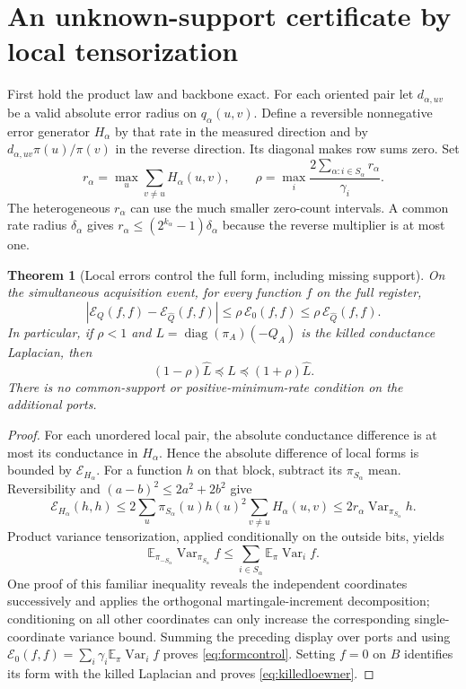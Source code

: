 \documentclass[10pt,a4paper]{article}
\newtheorem{theorem}{Theorem}[section]
\theoremstyle{definition}\newtheorem{assumption}[theorem]{Assumption}
\newcommand{\E}{\mathbb E}
\newcommand{\Var}{\operatorname{Var}}
\newcommand{\diag}{\operatorname{diag}}
\newcommand{\cE}{\mathcal E}
\begin{document}
\section{An unknown-support certificate by local tensorization}
\label{sec:tensor}

First hold the product law and backbone exact. For each oriented pair let $d_{\alpha,uv}$ be a valid absolute error radius on $q_\alpha(u,v)$. Define a reversible nonnegative error generator $H_\alpha$ by that rate in the measured direction and by $d_{\alpha,uv}\pi(u)/\pi(v)$ in the reverse direction. Its diagonal makes row sums zero. Set
\begin{equation}
 r_\alpha=\max_u\sum_{v\ne u}H_\alpha(u,v),\qquad
 \rho=\max_i\frac{2\sum_{\alpha:i\in S_\alpha}r_\alpha}{\gamma_i}.
 \label{eq:rho}
\end{equation}
The heterogeneous $r_\alpha$ can use the much smaller zero-count intervals. A common rate radius $\delta_\alpha$ gives $r_\alpha\le(2^{k_\alpha}-1)\delta_\alpha$ because the reverse multiplier is at most one.

\begin{theorem}[Local errors control the full form, including missing support]
\label{thm:tensor}
On the simultaneous acquisition event, for every function $f$ on the full register,
\begin{equation}
 |\cE_Q(f,f)-\cE_{\widehat Q}(f,f)|
 \le \rho\,\cE_0(f,f)\le\rho\,\cE_{\widehat Q}(f,f).
 \label{eq:formcontrol}
\end{equation}
In particular, if $\rho<1$ and $L=\diag(\pi_A)(-Q_A)$ is the killed conductance Laplacian, then
\begin{equation}
 (1-\rho)\widehat L\preceq L\preceq(1+\rho)\widehat L.
 \label{eq:killedloewner}
\end{equation}
There is no common-support or positive-minimum-rate condition on the additional ports.
\end{theorem}

\begin{proof}
For each unordered local pair, the absolute conductance difference is at most its conductance in $H_\alpha$. Hence the absolute difference of local forms is bounded by $\cE_{H_\alpha}$. For a function $h$ on that block, subtract its $\pi_{S_\alpha}$ mean. Reversibility and $(a-b)^2\le2a^2+2b^2$ give
\[
 \cE_{H_\alpha}(h,h)
 \le2\sum_u\pi_{S_\alpha}(u)h(u)^2
                  \sum_{v\ne u}H_\alpha(u,v)
 \le2r_\alpha\Var_{\pi_{S_\alpha}}h .
\]
Product variance tensorization, applied conditionally on the outside bits, yields
\[
 \E_{\pi_{-S_\alpha}}\Var_{\pi_{S_\alpha}}f
 \le\sum_{i\in S_\alpha}\E_\pi\Var_i f.
\]
One proof of this familiar inequality reveals the independent coordinates successively and applies the orthogonal martingale-increment decomposition; conditioning on all other coordinates can only increase the corresponding single-coordinate variance bound. Summing the preceding display over ports and using
$\cE_0(f,f)=\sum_i\gamma_i\E_\pi\Var_i f$
proves \eqref{eq:formcontrol}. Setting $f=0$ on $B$ identifies its form with the killed Laplacian and proves \eqref{eq:killedloewner}.
\end{proof}
\end{document}
